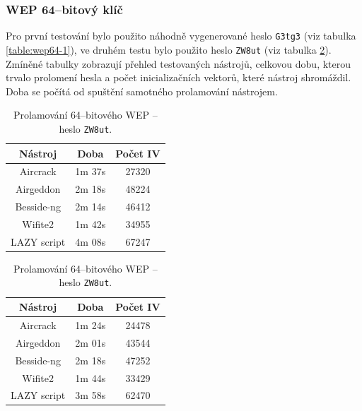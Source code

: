 \subsubsection*{WEP 64--bitový klíč}
Pro první testování bylo použito náhodně vygenerované heslo \texttt{G3tg3} (viz tabulka \ref{table:wep64-1}), ve druhém testu bylo použito heslo \texttt{ZW8ut} (viz tabulka \ref{table:wep64-2}). Zmíněné tabulky zobrazují přehled testovaných nástrojů, celkovou dobu, kterou trvalo prolomení hesla a počet inicializačních vektorů, které nástroj shromáždil. Doba se počítá od spuštění samotného prolamování nástrojem.

\begin{table}[htb]
\parbox{.45\linewidth}{
\centering
\begin{tabular}{|c|c|c|}
\hline
\textbf{Nástroj} & \textbf{Doba} & \textbf{Počet IV} \\ \hline
Aircrack         & 1m 37s                & 27320                   \\ \hline
Airgeddon        & 2m 18s                & 48224                   \\ \hline
Besside-ng       & 2m 14s                & 46412                   \\ \hline
Wifite2          & 1m 42s                & 34955                   \\ \hline
LAZY script      & 4m 08s                & 67247                   \\ \hline
\end{tabular}
\caption{Prolamování 64--bitového WEP -- heslo \texttt{G3tg3}.}
\label{table:wep64-1}
}
\hfill
\parbox{.45\linewidth}{
\centering
\begin{tabular}{|c|c|c|}
\hline
\textbf{Nástroj} & \textbf{Doba} & \textbf{Počet IV} \\ \hline
Aircrack         & 1m 24s                & 24478                   \\ \hline
Airgeddon        & 2m 01s                & 43544                   \\ \hline
Besside-ng       & 2m 18s                & 47252                   \\ \hline
Wifite2          & 1m 44s                & 33429                   \\ \hline
LAZY script      & 3m 58s                & 62470                   \\ \hline
\end{tabular}
\caption{Prolamování 64--bitového WEP -- heslo \texttt{ZW8ut}.}
\label{table:wep64-2}
}
\end{table}

